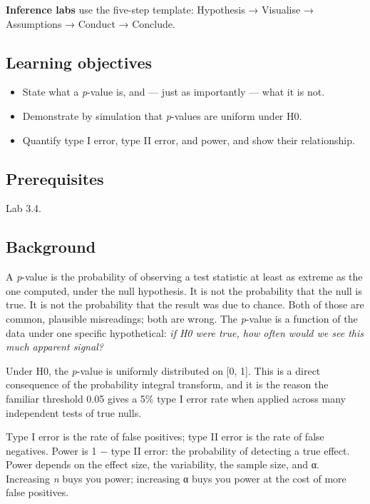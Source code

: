 \documentclass[
]{article}
\author{}
\date{\vspace{-2.5em}}
\providecommand{\tightlist}{%
  \setlength{\itemsep}{0pt}\setlength{\parskip}{0pt}}
\begin{document}
\textbf{Inference labs} use the five-step template: Hypothesis →
Visualise → Assumptions → Conduct → Conclude.

\subsection{Learning objectives}\label{learning-objectives}

\begin{itemize}
\tightlist
\item
  State what a \emph{p}-value is, and --- just as importantly --- what
  it is not.
\item
  Demonstrate by simulation that \emph{p}-values are uniform under H0.
\item
  Quantify type I error, type II error, and power, and show their
  relationship.
\end{itemize}

\subsection{Prerequisites}\label{prerequisites}

Lab 3.4.

\subsection{Background}\label{background}

A \emph{p}-value is the probability of observing a test statistic at
least as extreme as the one computed, under the null hypothesis. It is
not the probability that the null is true. It is not the probability
that the result was due to chance. Both of those are common, plausible
misreadings; both are wrong. The \emph{p}-value is a function of the
data under one specific hypothetical: \emph{if H0 were true, how often
would we see this much apparent signal?}

Under H0, the \emph{p}-value is uniformly distributed on {[}0, 1{]}.
This is a direct consequence of the probability integral transform, and
it is the reason the familiar threshold 0.05 gives a 5\% type I error
rate when applied across many independent tests of true nulls.

Type I error is the rate of false positives; type II error is the rate
of false negatives. Power is 1 − type II error: the probability of
detecting a true effect. Power depends on the effect size, the
variability, the sample size, and α. Increasing \emph{n} buys you power;
increasing α buys you power at the cost of more false positives.
\end{document}
